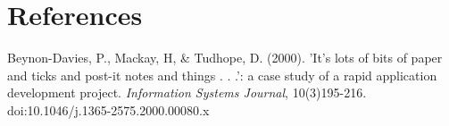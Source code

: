 \documentclass[11pt,twoside,a4paper]{article}
\begin{document}
\section*{References}
Beynon-Davies, P., Mackay, H, \& Tudhope, D. (2000). 'It's lots of bits of paper and ticks and post-it notes and things . . .': a case study of a rapid application development project. \emph{Information Systems Journal}, 10(3)195-216. doi:10.1046/j.1365-2575.2000.00080.x
\end{document}
